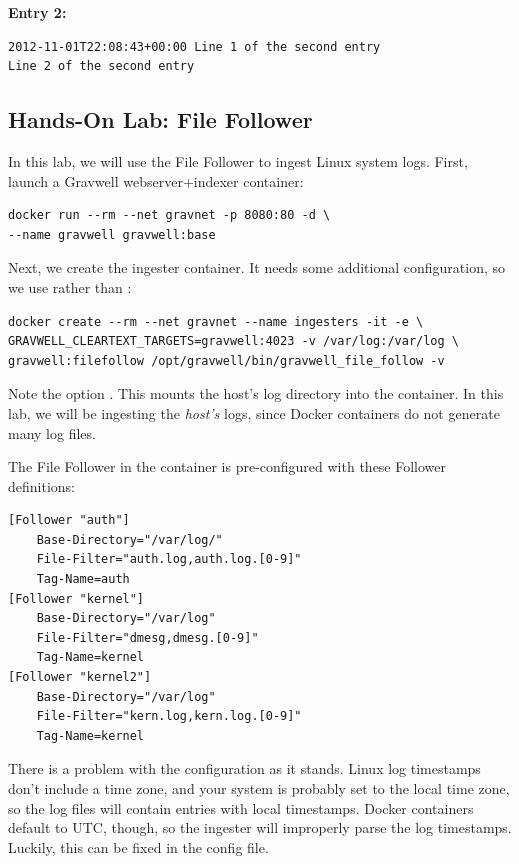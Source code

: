 \textbf{Entry 2:}

\begin{Verbatim}[breaklines=true]
2012-11-01T22:08:43+00:00 Line 1 of the second entry
Line 2 of the second entry
\end{Verbatim}

\subsection{Hands-On Lab: File Follower}

In this lab, we will use the File Follower to ingest Linux system logs.
First, launch a Gravwell webserver+indexer container:

\begin{Verbatim}[breaklines=true]
docker run --rm --net gravnet -p 8080:80 -d \
--name gravwell gravwell:base
\end{Verbatim}

Next, we create the ingester container. It needs some additional
configuration, so we use \code{docker create} rather than :

\begin{Verbatim}[breaklines=true]
docker create --rm --net gravnet --name ingesters -it -e \
GRAVWELL_CLEARTEXT_TARGETS=gravwell:4023 -v /var/log:/var/log \
gravwell:filefollow /opt/gravwell/bin/gravwell_file_follow -v
\end{Verbatim}

Note the option \code{-v /var/log:/var/log}. This mounts the host's
log directory into the container. In this lab, we will be ingesting the
\emph{host's} logs, since Docker containers do not generate many log
files.

The File Follower in the container is pre-configured with these
Follower definitions:

\begin{Verbatim}[breaklines=true]
[Follower "auth"]
    Base-Directory="/var/log/"
    File-Filter="auth.log,auth.log.[0-9]"
    Tag-Name=auth
[Follower "kernel"]
    Base-Directory="/var/log"
    File-Filter="dmesg,dmesg.[0-9]"
    Tag-Name=kernel
[Follower "kernel2"]
    Base-Directory="/var/log"
    File-Filter="kern.log,kern.log.[0-9]"
    Tag-Name=kernel
\end{Verbatim}

There is a problem with the configuration as it stands. Linux log
timestamps don't include a time zone, and your system is probably set to
the local time zone, so the log files will contain entries with local
timestamps. Docker containers default to UTC, though, so the ingester
will improperly parse the log timestamps. Luckily, this can be fixed in
the config file. 

